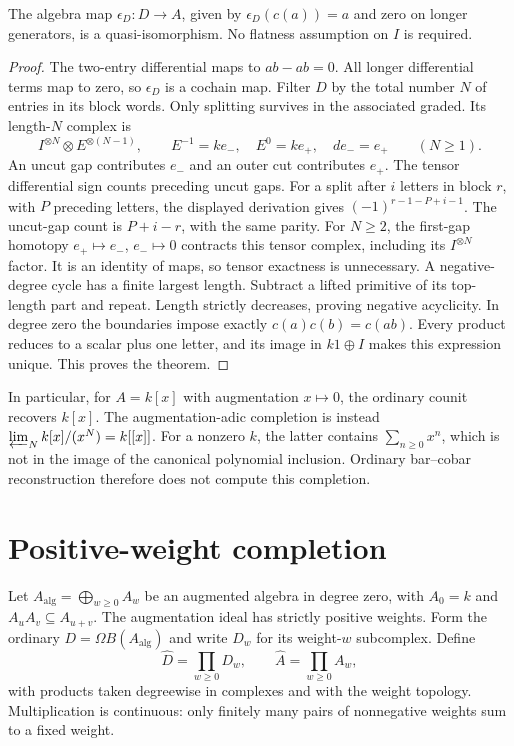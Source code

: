 \begin{theorem}\label{thm:internal-kd}
The algebra map $\epsilon_D:D\to A$, given by
$\epsilon_D(c(a))=a$ and zero on longer generators, is a quasi-isomorphism.
No flatness assumption on $I$ is required.
\end{theorem}
\begin{proof}
The two-entry differential maps to $ab-ab=0$.
All longer differential terms map to zero, so $\epsilon_D$ is a cochain map.
Filter $D$ by the total number $N$ of entries in its block words.
Only splitting survives in the associated graded.
Its length-$N$ complex is
\[
 I^{\otimes N}\otimes E^{\otimes(N-1)},\qquad
 E^{-1}=ke_-,\quad E^0=ke_+,\quad de_-=e_+\qquad(N\ge1).
\]
An uncut gap contributes $e_-$ and an outer cut contributes $e_+$.
The tensor differential sign counts preceding uncut gaps.
For a split after $i$ letters in block $r$, with $P$ preceding letters,
the displayed derivation gives $(-1)^{r-1-P+i-1}$.
The uncut-gap count is $P+i-r$, with the same parity.
For $N\ge2$, the first-gap homotopy $e_+\mapsto e_-$, $e_-\mapsto0$
contracts this tensor complex, including its $I^{\otimes N}$ factor.
It is an identity of maps, so tensor exactness is unnecessary.
A negative-degree cycle has a finite largest length.
Subtract a lifted primitive of its top-length part and repeat.
Length strictly decreases, proving negative acyclicity.
In degree zero the boundaries impose exactly $c(a)c(b)=c(ab)$.
Every product reduces to a scalar plus one letter, and its image in
$k1\oplus I$ makes this expression unique. This proves the theorem.
\end{proof}

In particular, for $A=k[x]$ with augmentation $x\mapsto0$,
the ordinary counit recovers $k[x]$.
The augmentation-adic completion is instead
$\varprojlim_N k[x]/(x^N)=k[[x]]$.
For a nonzero $k$, the latter contains $\sum_{n\ge0}x^n$,
which is not in the image of the canonical polynomial inclusion.
Ordinary bar--cobar reconstruction therefore does not compute this completion.

\section{Positive-weight completion}
Let $A_{\mathrm{alg}}=\bigoplus_{w\ge0}A_w$ be an augmented algebra in degree zero,
with $A_0=k$ and $A_uA_v\subseteq A_{u+v}$.
The augmentation ideal has strictly positive weights.
Form the ordinary $D=\Omega B(A_{\mathrm{alg}})$ and write $D_w$ for its weight-$w$ subcomplex.
Define
\[
 \widehat D=\prod_{w\ge0}D_w,\qquad
 \widehat A=\prod_{w\ge0}A_w,
\]
with products taken degreewise in complexes and with the weight topology.
Multiplication is continuous: only finitely many pairs of nonnegative weights sum to a fixed weight.

